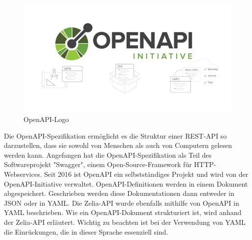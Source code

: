 
\begin{figure}[H]
    \centering
    \includegraphics{media/OpenAPI/OpenAPILogo.png}
    \caption{OpenAPI-Logo \cite{RestSoap}}
\end{figure}

Die OpenAPI-Spezifikation ermöglicht es die Struktur einer REST-API so darzustellen, dass sie sowohl von Menschen als auch von Computern gelesen werden kann. Angefangen hat die OpenAPI-Spezifikation als Teil des Softwareprojekt "Swagger", einem Open-Source-Framework für HTTP-Webservices. Seit 2016 ist OpenAPI ein selbstständiges Projekt und wird von der OpenAPI-Initiative verwaltet. OpenAPI-Definitionen werden in einem Dokument abgespeichert. Geschrieben werden diese Dokumentationen dann entweder in JSON oder in YAML. Die Zelia-API wurde ebenfalls mithilfe von OpenAPI in YAML beschrieben. Wie ein OpenAPI-Dokument strukturiert ist, wird anhand der Zelia-API erläutert. Wichtig zu beachten ist bei der Verwendung von YAML die Einrückungen, die in dieser Sprache essenziell sind. \cite{OpenAPIGeneral}